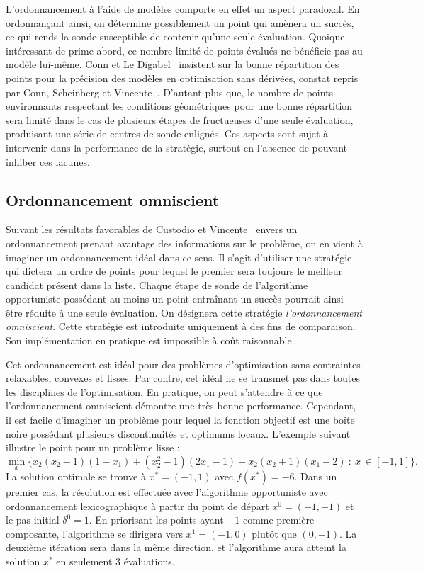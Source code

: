L'ordonnancement à l'aide de modèles comporte en effet un aspect paradoxal. En ordonnançant ainsi, on détermine possiblement un point qui amènera un succès, ce qui rends la sonde susceptible de contenir qu'une seule évaluation. Quoique intéressant de prime abord, ce nombre limité de points évalués ne bénéficie pas au modèle lui-même. Conn et Le Digabel~\cite{CoLed2011} insistent sur la bonne répartition des points pour la précision des modèles en optimisation sans dérivées, constat repris par Conn, Scheinberg et Vincente~\cite{CoScVi2005,CoScVi2006}. D'autant plus que, le nombre de points environnants respectant les conditions géométriques pour une bonne répartition sera limité dans le cas de plusieurs étapes de \POLL fructueuses d'une seule évaluation, produisant une série de centres de sonde enlignés. Ces aspects sont sujet à intervenir dans la performance de la stratégie, surtout en l'absence de \SEARCH pouvant inhiber ces lacunes.  
  

\subsection{Ordonnancement omniscient}\label{sec:omn}
Suivant les résultats favorables de Custodio et Vincente~\cite{CuVi07} envers un ordonnancement prenant avantage des informations sur le problème, on en vient à imaginer un ordonnancement idéal dans ce sens. Il s'agit d'utiliser une stratégie qui dictera un ordre de points pour lequel le premier sera toujours le meilleur candidat présent dans la liste. Chaque étape de sonde de l'algorithme opportuniste possédant au moins un point entraînant un succès pourrait ainsi être réduite à une seule évaluation. On désignera cette stratégie \emph{l'ordonnancement omniscient}. Cette stratégie est introduite uniquement à des fins de comparaison. Son implémentation en pratique est impossible à coût raisonnable.
  
Cet ordonnancement est idéal pour des problèmes d'optimisation sans contraintes relaxables, convexes et lisses. Par contre, cet idéal ne se transmet pas dans toutes les disciplines de l'optimisation. En pratique, on peut s'attendre à ce que l'ordonnancement omniscient démontre une très bonne performance. Cependant, il est facile d'imaginer un problème pour lequel la fonction objectif est une boîte noire possédant plusieurs discontinuités et optimums locaux. L'exemple suivant illustre le point pour un problème lisse :
$$\underset{x}{\min}\{x_2(x_2-1)(1-x_1) + (x_2^2-1)(2x_1-1) + x_2(x_2+1)(x_1-2)\ :\ x\ \in [-1,1]\}.$$
La solution optimale se trouve à $x^* = (-1,1)$ avec $f(x^*) = -6$. Dans un premier cas, la résolution est effectuée avec l'algorithme \CS opportuniste avec ordonnancement lexicographique à partir du point de départ $x^0 = (-1,-1)$ et le pas initial $\delta^0=1$. En priorisant les points ayant $-1$ comme première composante, l'algorithme se dirigera vers $x^1 = (-1,0)$ plutôt que $(0,-1)$. La deuxième itération sera dans la même direction, et l'algorithme aura atteint la solution $x^*$ en seulement 3 évaluations.  
  
